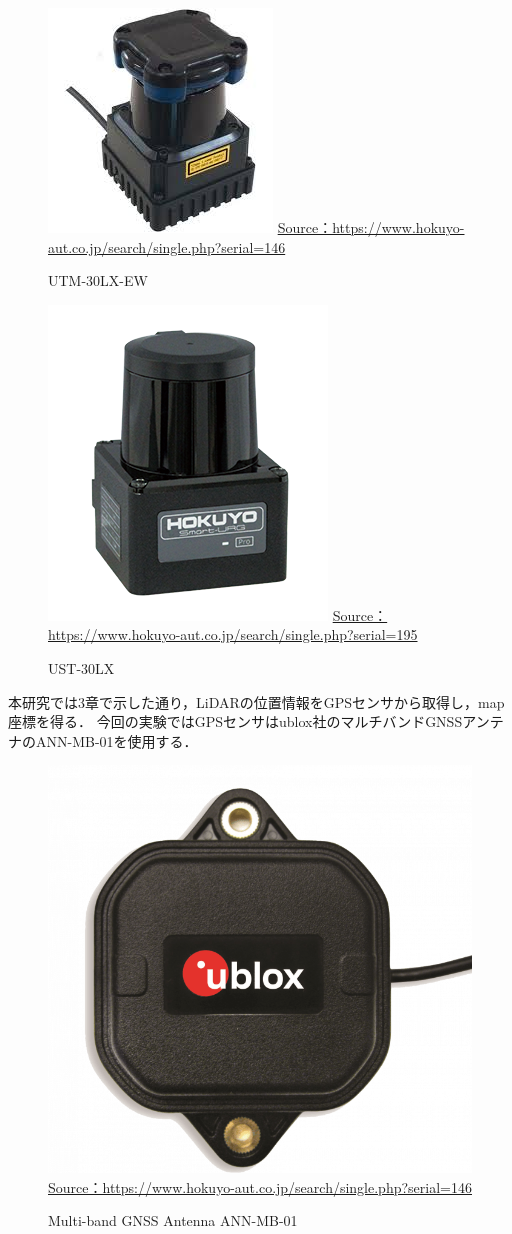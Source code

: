 \documentclass[autodetect-engine,dvipdfmx-if-dvi,ja=standard,a4j,jbase=11pt,magstyle=nomag*]{bxjsreport}
\begin{document}
\begin{figure}[b]
    \centering
    \includegraphics[width=0.5\linewidth, clip]{./figure/chapter4/lidar1.jpg}
    \url{Source：https://www.hokuyo-aut.co.jp/search/single.php?serial=146}
    \caption{UTM-30LX-EW}
    \label{fig:lidar1}
\end{figure}

\begin{figure}[t]
    \centering
    \includegraphics[width=0.5\linewidth, clip]{./figure/chapter4/lidar2.png}
    \url{Source：https://www.hokuyo-aut.co.jp/search/single.php?serial=195}
    \caption{UST-30LX}
    \label{fig:lidar2}
\end{figure}

本研究では3章で示した通り，LiDARの位置情報をGPSセンサから取得し，map座標を得る．
今回の実験ではGPSセンサはublox社のマルチバンドGNSSアンテナのANN-MB-01を使用する．

\begin{figure}[h]
    \centering
    \includegraphics[width=0.5\linewidth, clip]{./figure/chapter4/GPS.png}
    \url{Source：https://www.hokuyo-aut.co.jp/search/single.php?serial=146}
    \caption{Multi-band GNSS Antenna ANN-MB-01}
    \label{fig:GPS}
\end{figure}
\end{document}
